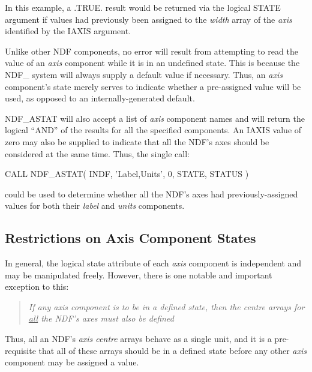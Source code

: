 \documentclass[twoside,11pt,nolof]{starlink}
\providecommand{\st}[1]{{\emph{#1}}}
\begin{document}
In this example, a .TRUE. result would be returned via the logical STATE
argument if values had previously been assigned to the \st{width\/} array
of the \st{axis\/} identified by the IAXIS argument.

Unlike other NDF components, no error will result from attempting to read
the value of an \st{axis\/} component while it is in an undefined state.
This is because the NDF\_ system will always supply a default value if
necessary.
Thus, an \st{axis\/} component's state merely serves to indicate whether a
pre-assigned value will be used, as opposed to an internally-generated
default.

NDF\_ASTAT will also accept a list of \st{axis\/} component names and
will return the logical ``AND'' of the results for all the specified
components.  An IAXIS value of zero may also be supplied to indicate
that all the NDF's axes should be considered at the same time.  Thus,
the single call:

\small
\begin{terminalv}
      CALL NDF_ASTAT( INDF, 'Label,Units', 0, STATE, STATUS )
\end{terminalv}
\normalsize

could be used to determine whether all the NDF's axes had
previously-assigned values for both their \st{label\/} and \st{units\/}
components.

\subsection{\label{ss:axisstate}Restrictions on Axis Component States}

In general, the logical state attribute of each \st{axis\/} component is
independent and may be manipulated freely.
However, there is one notable and important exception to this:

\begin{quote}
\begin{center}
\st{If any \st{axis\/} component is to be in a defined state, then the
\st{centre\/} arrays for \underline{all} the NDF's \st{axes} must also be
defined}
\end{center}
\end{quote}

Thus, all an NDF's \st{axis centre\/} arrays behave as a single unit, and
it is a pre-requisite that all of these arrays should be in a defined state
before any other \st{axis\/} component may be assigned a value.
\end{document}
